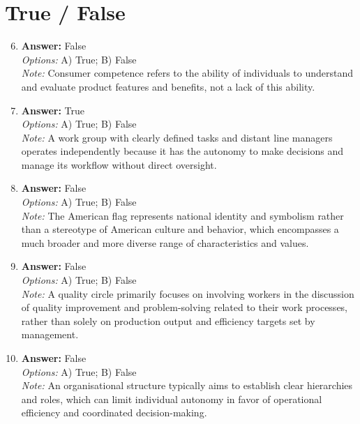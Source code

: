 \documentclass[12pt]{article}
\begin{document}
\section*{True / False}
\begin{enumerate}[label=\arabic*.]
\setcounter{enumi}{5}
\item \textbf{Answer:} False
\\ \textit{Options:} A) True; B) False
\\ \textit{Note:} Consumer competence refers to the ability of individuals to understand and evaluate product features and benefits, not a lack of this ability.
\item \textbf{Answer:} True
\\ \textit{Options:} A) True; B) False
\\ \textit{Note:} A work group with clearly defined tasks and distant line managers operates independently because it has the autonomy to make decisions and manage its workflow without direct oversight.
\item \textbf{Answer:} False
\\ \textit{Options:} A) True; B) False
\\ \textit{Note:} The American flag represents national identity and symbolism rather than a stereotype of American culture and behavior, which encompasses a much broader and more diverse range of characteristics and values.
\item \textbf{Answer:} False
\\ \textit{Options:} A) True; B) False
\\ \textit{Note:} A quality circle primarily focuses on involving workers in the discussion of quality improvement and problem-solving related to their work processes, rather than solely on production output and efficiency targets set by management.
\item \textbf{Answer:} False
\\ \textit{Options:} A) True; B) False
\\ \textit{Note:} An organisational structure typically aims to establish clear hierarchies and roles, which can limit individual autonomy in favor of operational efficiency and coordinated decision-making.
\end{enumerate}
\end{document}
